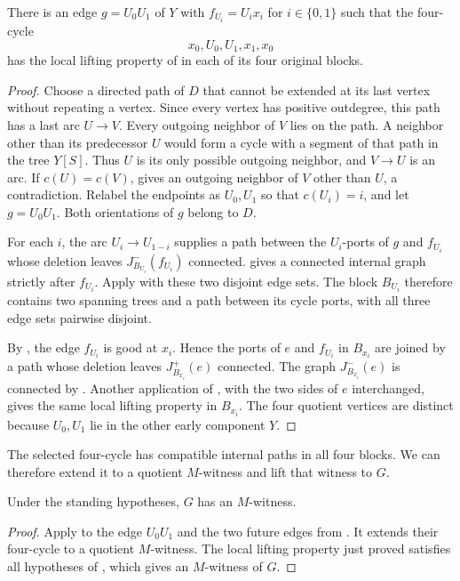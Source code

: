 \documentclass[USenglish, a4paper, thm-restate,numberwithinsect, cleveref]{lipics-v2021}
\begin{document}
\begin{lemma}
\label{lem:characterization-compatible-actual-cycle}
There is an edge $g=U_0U_1$ of $Y$ with $f_{U_i}=U_ix_i$ for
$i\in\{0,1\}$ such that the four-cycle
\[
 x_0,U_0,U_1,x_1,x_0
\]
has the local lifting property of  in each
of its four original blocks.
\end{lemma}
\begin{proof}
Choose a directed path of $D$ that cannot be extended at its last
vertex without repeating a vertex. Since every vertex has positive
outdegree, this path has a last arc $U\to V$. Every outgoing neighbor
of $V$ lies on the path. A neighbor other than its predecessor $U$
would form a cycle with a segment of that path in the tree $Y[S]$.
Thus $U$ is its only possible outgoing neighbor, and $V\to U$ is an arc.
If $c(U)=c(V)$,  gives
an outgoing neighbor of $V$ other than $U$, a contradiction.
Relabel the endpoints as $U_0,U_1$ so that $c(U_i)=i$, and let
$g=U_0U_1$. Both orientations of $g$ belong to $D$.

For each $i$, the arc $U_i\to U_{1-i}$ supplies a path between
the $U_i$-ports of $g$ and $f_{U_i}$ whose deletion leaves
$J_{B_{U_i}}^-(f_{U_i})$ connected.
 gives a connected
internal graph strictly after $f_{U_i}$. Apply
 with these two disjoint edge sets. The
block $B_{U_i}$ therefore contains two spanning trees and a path
between its cycle ports, with all three edge sets pairwise disjoint.

By , the edge $f_{U_i}$ is good at
$x_i$. Hence the ports of $e$ and $f_{U_i}$ in $B_{x_i}$ are joined
by a path whose deletion leaves $J_{B_{x_i}}^+(e)$ connected.
The graph $J_{B_{x_i}}^-(e)$ is connected by
. Another application
of , with the two sides of $e$ interchanged,
gives the same local lifting property in $B_{x_i}$.
The four quotient vertices are distinct because $U_0,U_1$ lie in
the other early component $Y$.
\end{proof}

The selected four-cycle has compatible internal paths in all four
blocks. We can therefore extend it to a quotient $M$-witness and lift
that witness to $G$.

\begin{corollary}\label{cor:characterization-optimal-quotient-lift}
Under the standing hypotheses, $G$ has an $M$-witness.
\end{corollary}
\begin{proof}
Apply  to the edge $U_0U_1$ and
the two future edges from .
It extends their four-cycle to a quotient $M$-witness. The local
lifting property just proved satisfies all hypotheses of
, which gives an $M$-witness of $G$.
\end{proof}
\end{document}
